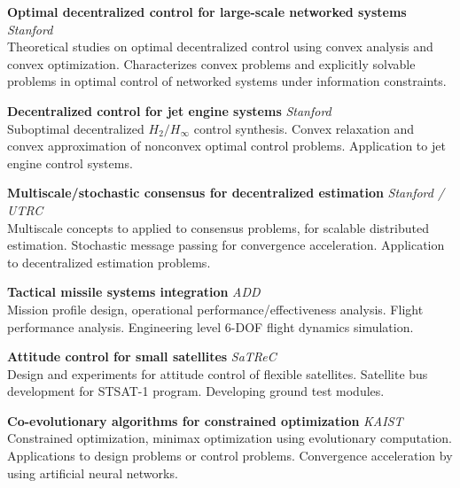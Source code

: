 \documentclass[margin,line]{res}
\begin{document}
\begin{resume}
\textbf{Optimal decentralized control for large-scale networked systems}
\hfill \emph{Stanford} \\
Theoretical studies on optimal decentralized control using convex analysis and convex optimization. Characterizes convex problems and explicitly solvable problems in optimal control of networked systems under information constraints.

\textbf{Decentralized control for jet engine systems}
\hfill \emph{Stanford} \\
Suboptimal decentralized $H_2/H_{\infty}$ control synthesis.
Convex relaxation and convex approximation of nonconvex optimal control problems. 
Application to jet engine control systems.


\textbf{Multiscale/stochastic consensus for decentralized estimation}
\hfill \emph{Stanford / UTRC} \\
Multiscale concepts to applied to consensus problems, for scalable distributed
estimation. Stochastic message passing for convergence acceleration. 
Application to decentralized estimation problems.

\textbf{Tactical missile systems integration}
\hfill \emph{ADD} \\
Mission profile design, operational performance/effectiveness analysis. Flight
performance analysis. Engineering level 6-DOF flight dynamics simulation. 

\textbf{Attitude control for small satellites}
\hfill \emph{SaTReC} \\
Design and experiments for attitude control of flexible satellites. Satellite
bus development for STSAT-1 program. Developing ground test modules.

\textbf{Co-evolutionary algorithms for constrained optimization}
\hfill \emph{KAIST} \\
Constrained optimization, minimax optimization using evolutionary computation.
Applications to design problems or control problems. Convergence
acceleration by using artificial neural networks.

\section{}


\end{resume}
\end{document}
